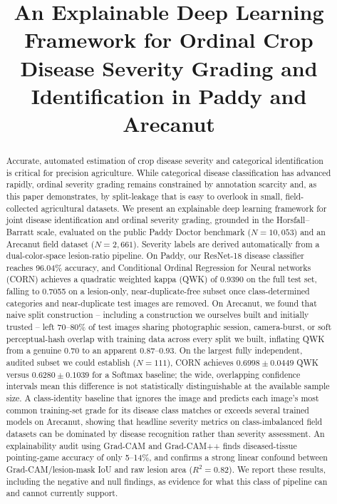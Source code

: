 \documentclass[conference]{IEEEtran}
\begin{document}
\title{An Explainable Deep Learning Framework for Ordinal Crop Disease Severity Grading and Identification in Paddy and Arecanut}

\author{
}

\maketitle

\begin{abstract}
Accurate, automated estimation of crop disease severity and categorical identification is critical for precision agriculture. While categorical disease classification has advanced rapidly, ordinal severity grading remains constrained by annotation scarcity and, as this paper demonstrates, by split-leakage that is easy to overlook in small, field-collected agricultural datasets. We present an explainable deep learning framework for joint disease identification and ordinal severity grading, grounded in the Horsfall--Barratt scale, evaluated on the public Paddy Doctor benchmark ($N=10{,}053$) and an Arecanut field dataset ($N=2{,}661$). Severity labels are derived automatically from a dual-color-space lesion-ratio pipeline. On Paddy, our ResNet-18 disease classifier reaches 96.04\% accuracy, and Conditional Ordinal Regression for Neural networks (CORN) achieves a quadratic weighted kappa (QWK) of 0.9390 on the full test set, falling to 0.7055 on a lesion-only, near-duplicate-free subset once class-determined categories and near-duplicate test images are removed. On Arecanut, we found that naive split construction -- including a construction we ourselves built and initially trusted -- left 70--80\% of test images sharing photographic session, camera-burst, or soft perceptual-hash overlap with training data across every split we built, inflating QWK from a genuine $0.70$ to an apparent $0.87$--$0.93$. On the largest fully independent, audited subset we could establish ($N=111$), CORN achieves $0.6998 \pm 0.0449$ QWK versus $0.6280 \pm 0.1039$ for a Softmax baseline; the wide, overlapping confidence intervals mean this difference is not statistically distinguishable at the available sample size. A class-identity baseline that ignores the image and predicts each image's most common training-set grade for its disease class matches or exceeds several trained models on Arecanut, showing that headline severity metrics on class-imbalanced field datasets can be dominated by disease recognition rather than severity assessment. An explainability audit using Grad-CAM and Grad-CAM++ finds diseased-tissue pointing-game accuracy of only 5--14\%, and confirms a strong linear confound between Grad-CAM/lesion-mask IoU and raw lesion area ($R^2=0.82$). We report these results, including the negative and null findings, as evidence for what this class of pipeline can and cannot currently support.
\end{abstract}
\end{document}
